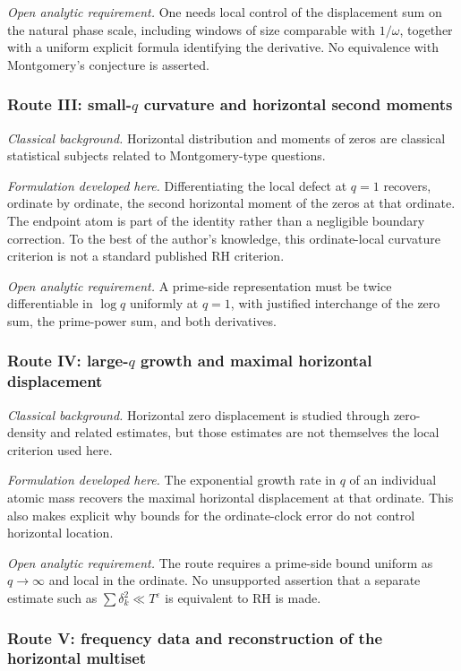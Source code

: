 \documentclass[11pt]{amsart}
\numberwithin{equation}{section}
\theoremstyle{plain}
\theoremstyle{definition}
\theoremstyle{remark}
\newcommand{\1}{\mathbf{1}}
\begin{document}
\emph{Open analytic requirement.}
One needs local control of the displacement sum on the natural phase scale,
including windows of size comparable with $1/\omega$, together with a uniform
explicit formula identifying the derivative. No equivalence with
Montgomery's conjecture is asserted.

\subsubsection*{Route III: small-$q$ curvature and horizontal second moments}

\emph{Classical background.}
Horizontal distribution and moments of zeros are classical statistical
subjects related to Montgomery-type questions.

\emph{Formulation developed here.}
Differentiating the local defect at $q=1$ recovers, ordinate by ordinate, the
second horizontal moment of the zeros at that ordinate. The endpoint atom is
part of the identity rather than a negligible boundary correction. To the
best of the author's knowledge, this ordinate-local curvature criterion is
not a standard published RH criterion.

\emph{Open analytic requirement.}
A prime-side representation must be twice differentiable in $\log q$ uniformly
at $q=1$, with justified interchange of the zero sum, the prime-power sum,
and both derivatives.

\subsubsection*{Route IV: large-$q$ growth and maximal horizontal displacement}

\emph{Classical background.}
Horizontal zero displacement is studied through zero-density and related
estimates, but those estimates are not themselves the local criterion used
here.

\emph{Formulation developed here.}
The exponential growth rate in $q$ of an individual atomic mass recovers the
maximal horizontal displacement at that ordinate. This also makes explicit
why bounds for the ordinate-clock error do not control horizontal location.

\emph{Open analytic requirement.}
The route requires a prime-side bound uniform as $q\to\infty$ and local in the
ordinate. No unsupported assertion that a separate estimate such as
$\sum\delta_k^2\ll T^\varepsilon$ is equivalent to RH is made.

\subsubsection*{Route V: frequency data and reconstruction of the horizontal multiset}
\end{document}
